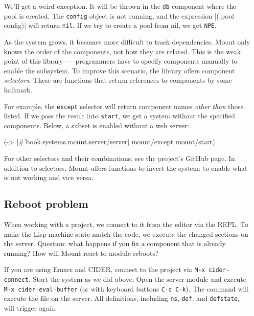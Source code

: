 We'll get a weird exception. It will be thrown in the \verb|db| component where the pool is created. The \verb|config| object is not running, and the expression \spverb|(:pool config)| will return \verb|nil|. If we try to create a pool from nil, we get \verb|NPE|.

As the system grows, it becomes more difficult to track dependencies. Mount only knows the order of the components, not how they are related. This is the weak point of this library~--- programmers have to specify components manually to enable the subsystem. To improve this scenario, the library offers component \emph{selectors}. These are functions that return references to components by some hallmark.

For example, the \verb|except| selector will return component names \emph{other than} those listed. If we pass the result into \verb|start|, we get a system without the specified components. Below, a subset is enabled without a web server:

\begin{english}
  \begin{clojure}
(-> [#'book.systems.mount.server/server]
    mount/except
    mount/start)
  \end{clojure}
\end{english}

For other selectors and their combinations, see the project's GitHub page. In addition to selectors, Mount offers functions to invert the system: to enable what is not working and vice versa.

\subsection{Reboot problem}

When working with a project, we connect to it from the editor via the REPL. To make the Lisp machine state match the code, we execute the changed sections on the server. Question: what happens if you fix a component that is already running? How will Mount react to module reboots?


If you are using Emacs and CIDER, connect to the project via \verb|M-x cider-connect|. Start the system as we did above. Open the server module and execute \verb|M-x cider-eval-buffer| (or with keyboard buttons \verb|C-c C-k|). The command will execute the file on the server. All definitions, including \verb|ns|, \verb|def|, and \verb|defstate|, will trigger again.

